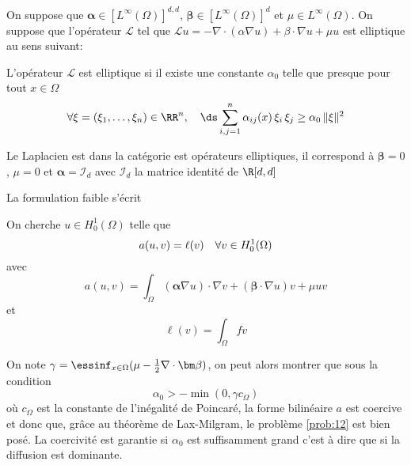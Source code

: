 On suppose que ${\bm \alpha} \in [L^{\infty}(\Omega)]^{d,d}$, ${\bm \beta} \in
[L^{\infty}(\Omega)]^{d}$ et $\mu \in L^\infty(\Omega)$. On suppose que
l'opérateur $\mathcal{L}$ tel que $\mathcal{L} u = -\nabla \cdot ( \alpha \nabla u
) + \beta \cdot \nabla u + \mu u$ est elliptique au sens suivant:

\begin{definition}
  \label{def:39}
  L'opérateur $\mathcal{L}$ est elliptique si il existe une constante $\alpha_0$
  telle que presque pour tout $x\in\Omega$
  \begin{equation}
    \label{eq:88}
    \forall \xi=(\xi_1, \ldots , \xi_n)\in\RR^n,\quad {\ds \sum_{i,j=1}^n  \alpha_{ij}(x) \, \xi_i \, \xi_j  \ge \alpha_0 \, \| \xi \|^2 }
  \end{equation}
\end{definition}

\begin{remark}
  \label{rem:29}
  Le Laplacien est dans la catégorie est opérateurs elliptiques, il correspond à
  ${\bm \beta} = 0$, $\mu = 0$ et ${\bm \alpha}=\mathcal{I}_d$ avec $\mathcal{I}_d$ la
  matrice identité de $\R[d,d]$
\end{remark}


La formulation faible s'écrit
\begin{problem}
  \label{prob:12}
  On cherche $u \in H^1_0(\Omega)$ telle que
  \begin{equation}
    \label{eq:89}
    a(u,v) = \ell(v) \quad \forall v \in H^1_0(\Omega)\\
  \end{equation}
  avec
  \begin{equation}
    \label{eq:90}
    a(u,v)=\int_\Omega ({\bm \alpha} \nabla u ) \cdot \nabla v + ({\bm \beta} \cdot
    \nabla u) v + \mu u v
  \end{equation}
  et
  \begin{equation}
    \label{eq:91}
    \ell(v) = \int_\Omega f v
  \end{equation}
\end{problem}

On note $\gamma = \essinf_{x \in \Omega} (\mu -\frac{1}{2} \nabla \cdot {\bm
\beta})$, on peut alors montrer que sous la condition
\begin{equation}
  \label{eq:92}
  \alpha_0 > - \min( 0, \gamma c_\Omega  )
\end{equation}
où $c_\Omega$ est la constante de l'inégalité de Poincaré, la forme bilinéaire
$a$ est coercive et donc que, grâce au théorème de Lax-Milgram, le problème
\ref{prob:12} est bien posé. La coercivité est garantie si $\alpha_0$ est
suffisamment grand c'est à dire que si la diffusion est dominante.

